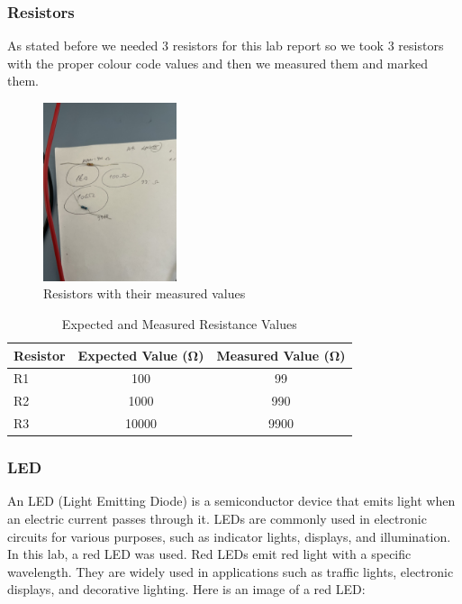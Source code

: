 \documentclass[a4paper, 10pt]{article}
\begin{document}
			\pagebreak

			\subsubsection{Resistors}
				As stated before we needed 3 resistors for this lab report so we took 3 resistors with the proper colour code values and then we measured them and marked them.

				\begin{figure}[h!]
					\centering
					\includegraphics[width=0.35\textwidth]{images/Resistors.jpeg}
					\caption{Resistors with their measured values}
					\label{fig:resistors}
				\end{figure}

	
				\begin{table}[h!]
					\centering
					\begin{tabular}{@{}l|S|S@{}} %
						\toprule
						{Resistor} & {Expected Value (\si{\ohm})} & {Measured Value (\si{\ohm})} \\
						\midrule
						R1 & 100 & 99 \\
						R2 & 1000 & 990 \\
						R3 & 10000 & 9900 \\
						\bottomrule
					\end{tabular}
					\caption{Expected and Measured Resistance Values}
					\label{tab:resistors}
				\end{table}

			\subsubsection{LED}
				An LED (Light Emitting Diode) is a semiconductor device that emits light when an electric current passes through it. LEDs are commonly used in electronic circuits for various purposes, such as indicator lights, displays, and illumination.
				In this lab, a red LED was used. Red LEDs emit red light with a specific wavelength. They are widely used in applications such as traffic lights, electronic displays, and decorative lighting.
				Here is an image of a red LED:
\end{document}
